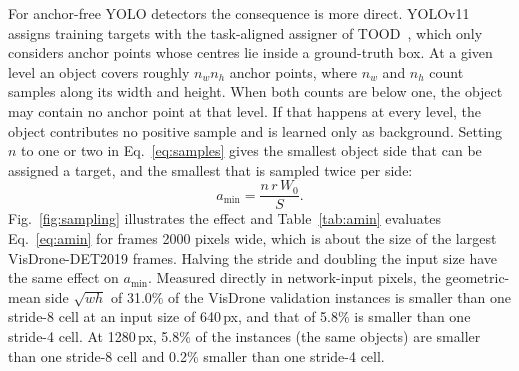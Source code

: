 \documentclass[preprint,12pt]{elsarticle}
\begin{document}
For anchor-free YOLO detectors the consequence is more direct. YOLOv11 assigns
training targets with the task-aligned assigner of TOOD~\cite{feng2021tood}, which
only considers anchor points whose centres lie inside a ground-truth box. At a
given level an object covers roughly $n_w n_h$ anchor points, where $n_w$ and
$n_h$ count samples along its width and height. When both counts are below one,
the object may contain no anchor point at that level. If that happens at every
level, the object contributes no positive sample and is learned only as
background. Setting $n$ to one or two in Eq.~\eqref{eq:samples} gives the smallest
object side that can be assigned a target, and the smallest that is sampled twice
per side:
\begin{equation}
  a_{\min} = \frac{n\, r\, W_0}{S}.
  \label{eq:amin}
\end{equation}
Fig.~\ref{fig:sampling} illustrates the effect and Table~\ref{tab:amin} evaluates
Eq.~\eqref{eq:amin} for frames 2000 pixels wide, which is about the size of the
largest VisDrone-DET2019 frames. Halving the stride and doubling the input size
have the same effect on $a_{\min}$. Measured directly in network-input pixels, the
geometric-mean side $\sqrt{wh}$ of 31.0\% of the VisDrone validation instances is
smaller than one stride-8 cell at an input size of 640\,px, and that of 5.8\% is
smaller than one stride-4 cell. At 1280\,px, 5.8\% of the instances (the same
objects) are smaller than one stride-8 cell and 0.2\% smaller than one stride-4
cell.
\end{document}

